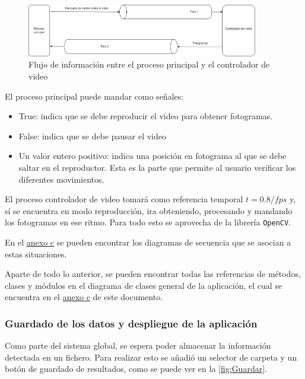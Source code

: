 \begin{enumerate}
    \begin{figure}[H]
        \centering
        \includegraphics[width=0.9\textwidth]{images/6/6.5/Procesos2.png}
        \caption{Flujo de información entre el proceso principal y el controlador de video}
        \label{fig:DatosVideo}
    \end{figure}

    El proceso principal puede mandar como señales:
    \begin{itemize}
        \item True: indica que se debe reproducir el video para obtener fotogramas.
        \item False: indica que se debe pausar el video
        \item Un valor entero positivo: indica una posición en fotograma al que se debe saltar en el reproductor. Esta es la parte que permite al usuario verificar los diferentes movimientos.
    \end{itemize}
    El proceso controlador de video tomará como referencia temporal $ t = 0.8/fps $ y, sí se encuentra en modo reproducción, ira obteniendo, procesando y mandando los fotogramas en ese ritmo. Para todo 
    esto se aprovecha de la librería \texttt{OpenCV}.
    
    En el \hyperref[esquema:SecuenciaResto]{anexo c} se pueden encontrar los diagramas de secuencia que se asocian a estas situaciones.
\end{enumerate}

\vspace{2\baselineskip}

Aparte de todo lo anterior, se pueden encontrar todas las referencias de métodos, clases y módulos en el diagrama de clases general de la aplicación, el cual se encuentra en el 
\hyperref[esquema:DiagramaClases]{anexo c} de este documento.

\clearpage
\subsubsection{Guardado de los datos y despliegue de la aplicación}

Como parte del sistema global, se espera poder almacenar la información detectada en un fichero. Para realizar esto se añadió un selector de carpeta y un botón de guardado de resultados, como se puede 
ver en la \autoref{fig:Guardar}.

